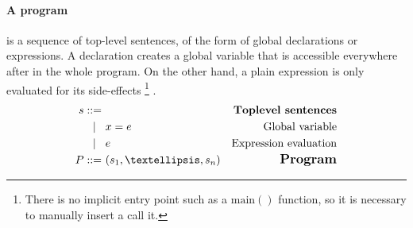 \paragraph{A program} is a sequence of top-level sentences, of the form of
global declarations or expressions. A declaration creates a global variable
that is accessible everywhere after in the whole program.
On the other hand, a plain expression is only evaluated for its side-effects
\footnote{
  There is no implicit entry point such as a $\mathrm{main}()$ function, so
  it is necessary to manually insert a call it.
}
.%
{ \small
\begin{align*}
  \gramdefshort{Toplevel sentences}{s}
                 { x = e }{Global variable}
                 { e     }{Expression evaluation}
                 {END}
  \\
  P \gramisa & (s_1, …, s_n) & {\textrm{\larger \textbf{Program}}}
\end{align*}}%
